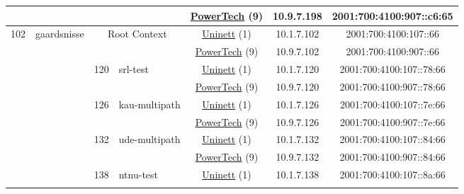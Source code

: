 \begin{small}
\begin{center}
\begin{longtable}{|c|c|c|c|c|c|c|c|}
  &  &  &  & \multicolumn{2}{|c|}{\tiny{\href{http://www.powertech.no}{PowerTech} (9)}} & \tiny{10.9.7.198} & \tiny{2001:700:4100:907::c6:65} \\ \hline
 \multirow{32}{*}{\tiny{102}} & \multicolumn{1}{|l|}{\multirow{32}{*}{\tiny{gaardsnisse}}} & \multicolumn{2}{|c|}{\multirow{2}{*}{\tiny{Root Context}}} & \multicolumn{2}{|c|}{\tiny{\href{https://www.uninett.no}{Uninett} (1)}} & \tiny{10.1.7.102} & \tiny{2001:700:4100:107::66} \\* \cline{5-5}\cline{6-6}\cline{7-7}\cline{8-8}
  &  & \multicolumn{2}{|c|}{} & \multicolumn{2}{|c|}{\tiny{\href{http://www.powertech.no}{PowerTech} (9)}} & \tiny{10.9.7.102} & \tiny{2001:700:4100:907::66} \\* \cline{3-3}\cline{4-4}\cline{5-5}\cline{6-6}\cline{7-7}\cline{8-8}
  &  & \multirow{2}{*}{\tiny{120}} & \multicolumn{1}{|l|}{\multirow{2}{*}{\tiny{srl-test}}} & \multicolumn{2}{|c|}{\tiny{\href{https://www.uninett.no}{Uninett} (1)}} & \tiny{10.1.7.120} & \tiny{2001:700:4100:107::78:66} \\* \cline{5-5}\cline{6-6}\cline{7-7}\cline{8-8}
  &  &  &  & \multicolumn{2}{|c|}{\tiny{\href{http://www.powertech.no}{PowerTech} (9)}} & \tiny{10.9.7.120} & \tiny{2001:700:4100:907::78:66} \\* \cline{3-3}\cline{4-4}\cline{5-5}\cline{6-6}\cline{7-7}\cline{8-8}
  &  & \multirow{2}{*}{\tiny{126}} & \multicolumn{1}{|l|}{\multirow{2}{*}{\tiny{kau-multipath}}} & \multicolumn{2}{|c|}{\tiny{\href{https://www.uninett.no}{Uninett} (1)}} & \tiny{10.1.7.126} & \tiny{2001:700:4100:107::7e:66} \\* \cline{5-5}\cline{6-6}\cline{7-7}\cline{8-8}
  &  &  &  & \multicolumn{2}{|c|}{\tiny{\href{http://www.powertech.no}{PowerTech} (9)}} & \tiny{10.9.7.126} & \tiny{2001:700:4100:907::7e:66} \\* \cline{3-3}\cline{4-4}\cline{5-5}\cline{6-6}\cline{7-7}\cline{8-8}
  &  & \multirow{2}{*}{\tiny{132}} & \multicolumn{1}{|l|}{\multirow{2}{*}{\tiny{ude-multipath}}} & \multicolumn{2}{|c|}{\tiny{\href{https://www.uninett.no}{Uninett} (1)}} & \tiny{10.1.7.132} & \tiny{2001:700:4100:107::84:66} \\* \cline{5-5}\cline{6-6}\cline{7-7}\cline{8-8}
  &  &  &  & \multicolumn{2}{|c|}{\tiny{\href{http://www.powertech.no}{PowerTech} (9)}} & \tiny{10.9.7.132} & \tiny{2001:700:4100:907::84:66} \\* \cline{3-3}\cline{4-4}\cline{5-5}\cline{6-6}\cline{7-7}\cline{8-8}
  &  & \multirow{2}{*}{\tiny{138}} & \multicolumn{1}{|l|}{\multirow{2}{*}{\tiny{ntnu-test}}} & \multicolumn{2}{|c|}{\tiny{\href{https://www.uninett.no}{Uninett} (1)}} & \tiny{10.1.7.138} & \tiny{2001:700:4100:107::8a:66} \\* \cline{5-5}\cline{6-6}\cline{7-7}\cline{8-8}

\end{longtable}
\end{center}
\end{small}
